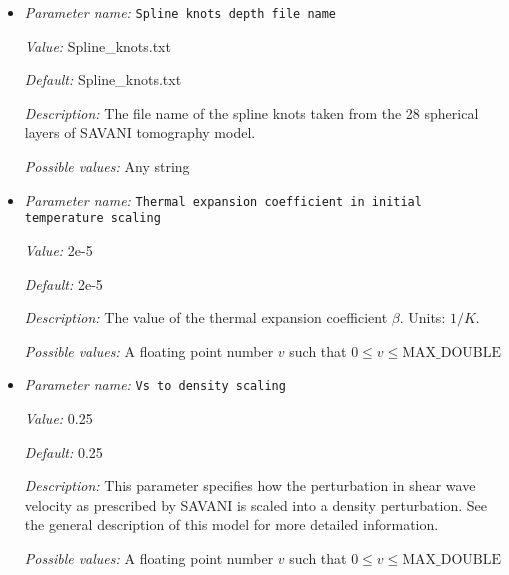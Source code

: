 \begin{itemize}
{\it Value:} false


{\it Default:} false


{\it Description:} Option to use a lower maximum order when reading the data file of spherical harmonic coefficients. This is probably used for the faster tests or when the users only want to see the spherical harmonic pattern up to a certain order.


{\it Possible values:} A boolean value (true or false)
\item {\it Parameter name:} {\tt Spline knots depth file name}
\label{parameters:Initial temperature model/SAVANI perturbation/Spline knots depth file name}


{\it Value:} Spline\_knots.txt


{\it Default:} Spline\_knots.txt


{\it Description:} The file name of the spline knots taken from the 28 spherical layers of SAVANI tomography model.


{\it Possible values:} Any string
\item {\it Parameter name:} {\tt Thermal expansion coefficient in initial temperature scaling}
\label{parameters:Initial temperature model/SAVANI perturbation/Thermal expansion coefficient in initial temperature scaling}


{\it Value:} 2e-5


{\it Default:} 2e-5


{\it Description:} The value of the thermal expansion coefficient $\beta$. Units: $1/K$.


{\it Possible values:} A floating point number $v$ such that $0 \leq v \leq \text{MAX\_DOUBLE}$
\item {\it Parameter name:} {\tt Vs to density scaling}
\label{parameters:Initial temperature model/SAVANI perturbation/Vs to density scaling}


{\it Value:} 0.25


{\it Default:} 0.25


{\it Description:} This parameter specifies how the perturbation in shear wave velocity as prescribed by SAVANI is scaled into a density perturbation. See the general description of this model for more detailed information.


{\it Possible values:} A floating point number $v$ such that $0 \leq v \leq \text{MAX\_DOUBLE}$
\end{itemize}

